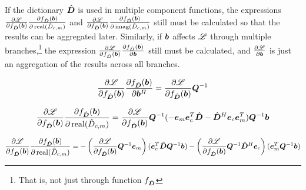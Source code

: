 \begin{appendices}
If the dictionary $\hat{\bm{D}}$ is used in multiple component functions, the expressions $\frac{\partial \mathscr{L}}{\partial f_{\hat{\bm{D}}}(\bm{b})}\frac{\partial f_{\hat{\bm{D}}}(\bm{b})}{\partial \operatorname{real}(\hat{D}_{c,m})}$ and $\frac{\partial \mathscr{L}}{\partial f_{\hat{\bm{D}}}(\bm{b})}\frac{\partial f_{\hat{\bm{D}}}(\bm{b})}{\partial \operatorname{imag}(\hat{D}_{c,m})}$ still must be calculated so that the results can be aggregated later. Similarly, if $\bm{b}$ affects $\mathscr{L}$ through multiple branches,\footnote{That is, not just through function $f_{\hat{\bm{D}}}$} the expression $\frac{\partial \mathscr{L}}{\partial f_{\hat{\bm{D}}}(\bm{b})}\frac{\partial f_{\hat{\bm{D}}}(\bm{b})}{\partial \bm{b}}$ still must be calculated, and $\frac{\partial \mathscr{L}}{\partial \bm{b}}$ is just an aggregation of the results across all branches.

\begin{equation}
\frac{\partial \mathscr{L}}{\partial f_{\hat{\bm{D}}}(\bm{b})}\frac{\partial f_{\hat{\bm{D}}}(\bm{b})}{\partial \bm{b}^H} = \frac{\partial \mathscr{L}}{\partial f_{\hat{\bm{D}}}(\bm{b})}\bm{Q}^{-1}
\end{equation}

\begin{equation}
\frac{\partial \mathscr{L}}{\partial f_{\hat{\bm{D}}}(\bm{b})}\frac{\partial f_{\hat{\bm{D}}}(\bm{b})}{\partial \operatorname{real}(\hat{D}_{c,m})} = \frac{\partial \mathscr{L}}{\partial f_{\hat{\bm{D}}}(\bm{b})}\bm{Q}^{-1}(-\bm{e}_m\bm{e}_c^T\hat{\bm{D}} - \hat{\bm{D}}^H\bm{e}_c\bm{e}_m^T)\bm{Q}^{-1}\bm{b}
\end{equation}

\begin{equation}
\frac{\partial \mathscr{L}}{\partial f_{\hat{\bm{D}}}(\bm{b})}\frac{\partial f_{\hat{\bm{D}}}(\bm{b})}{\partial \operatorname{real}(\hat{D}_{c,m})} = -\left(\frac{\partial \mathscr{L}}{\partial f_{\hat{\bm{D}}}(\bm{b})}\bm{Q}^{-1}\bm{e}_m\right)(\bm{e}_c^T\hat{\bm{D}}\bm{Q}^{-1}\bm{b}) - \left(\frac{\partial \mathscr{L}}{\partial f_{\hat{\bm{D}}}(\bm{b})}\bm{Q}^{-1}\hat{\bm{D}}^H\bm{e}_c\right)(\bm{e}_m^T\bm{Q}^{-1}\bm{b})
\end{equation}


\end{appendices}
